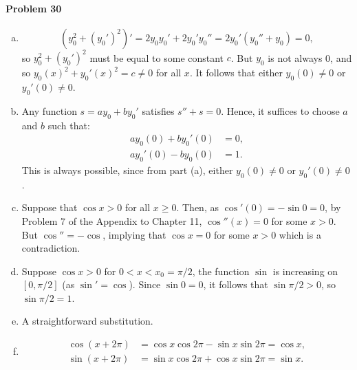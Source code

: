 \documentclass{article}
\begin{document}
\paragraph{Problem 30}
\begin{enumerate}[(a)]
  \item \[
      (y_0^2 + (y_0')^2)' = 2y_0y_0' + 2y_0'y_0'' = 2y_0'(y_0'' + y_0) = 0,
    \] so $y_0^2 + (y_0')^2$ must be equal to some constant $c$. But $y_0$ is
    not always 0, and so $y_0(x)^2 + y_0'(x)^2 = c \neq 0$ for all $x$. It
    follows that either $y_0(0) \neq 0$ or $y_0'(0) \neq 0$.
  \item Any function $s = ay_0 + by_0'$ satisfies $s'' + s = 0$. Hence, it
    suffices to choose $a$ and $b$ such that:
    \begin{align*}
      ay_0(0) + by_0'(0) &= 0, \\
      ay_0'(0) - by_0(0) &= 1.
    \end{align*}
    This is always possible, since from part (a), either $y_0(0) \neq 0$ or
    $y_0'(0) \neq 0$.
  \item Suppose that $\cos x > 0$ for all $x \geq 0$. Then, as $\cos'(0) =
    -\sin 0 = 0$, by Problem 7 of the Appendix to Chapter 11, $\cos''(x) = 0$
    for some $x > 0$. But $\cos'' = -\cos$, implying that $\cos x = 0$ for some
    $x > 0$ which is a contradiction.
  \item Suppose $\cos x > 0$ for $0 < x < x_0 = \pi/2$, the function $\sin$ is
    increasing on $[0, \pi/2]$ (as $\sin' = \cos$). Since $\sin 0 = 0$, it
    follows that $\sin \pi/2 > 0$, so $\sin \pi/2 = 1$.
  \item A straightforward substitution.
  \item \begin{align*}
      \cos(x + 2\pi) &= \cos x \cos 2\pi - \sin x \sin 2\pi = \cos x, \\
      \sin(x + 2\pi) &= \sin x \cos 2\pi + \cos x \sin 2\pi = \sin x.
    \end{align*}
\end{enumerate}
\end{document}
